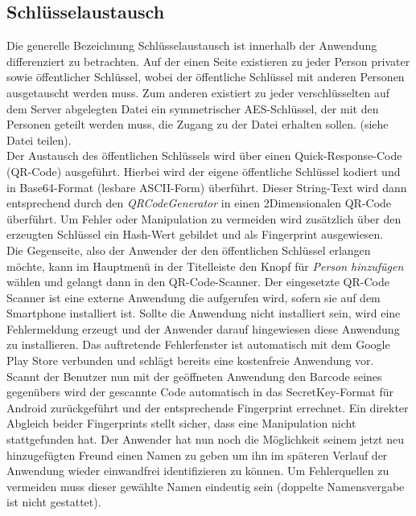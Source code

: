 \documentclass[10pt, a4paper,headsepline]{scrreprt}
\begin{document}
\subsection{Schlüsselaustausch}
Die generelle Bezeichnung Schlüsselaustausch ist innerhalb der Anwendung differenziert zu betrachten. Auf der einen Seite existieren zu jeder Person privater sowie öffentlicher Schlüssel, wobei der öffentliche Schlüssel mit anderen Personen ausgetauscht werden muss. Zum anderen existiert zu jeder verschlüsselten auf dem Server abgelegten Datei ein symmetrischer AES-Schlüssel, der mit den Personen geteilt werden muss, die Zugang zu der Datei erhalten sollen. (siehe Datei teilen). \\
Der Austausch des öffentlichen Schlüssels wird über einen Quick-Response-Code (QR-Code) ausgeführt. Hierbei wird der eigene öffentliche Schlüssel kodiert und in Base64-Format (lesbare ASCII-Form) überführt. Dieser String-Text wird dann entsprechend durch den \textit{QRCodeGenerator} in einen 2Dimensionalen QR-Code überführt. Um Fehler oder Manipulation zu vermeiden wird zusätzlich über den erzeugten Schlüssel ein Hash-Wert gebildet und als Fingerprint ausgewiesen. \\
Die Gegenseite, also der Anwender der den öffentlichen Schlüssel erlangen möchte, kann im Hauptmenü in der Titelleiste den Knopf für \textit{Person hinzufügen} wählen und gelangt dann in den QR-Code-Scanner. Der eingesetzte QR-Code Scanner ist eine externe Anwendung die aufgerufen wird, sofern sie auf dem Smartphone installiert ist. Sollte die Anwendung nicht installiert sein, wird eine Fehlermeldung erzeugt und der Anwender darauf hingewiesen diese Anwendung zu installieren. Das auftretende Fehlerfenster ist automatisch mit dem Google Play Store verbunden und schlägt bereits eine kostenfreie Anwendung vor. \\
Scannt der Benutzer nun mit der geöffneten Anwendung den Barcode seines gegenübers wird der gescannte Code automatisch in das SecretKey-Format für Android zurückgeführt und der entsprechende Fingerprint errechnet. Ein direkter Abgleich beider Fingerprints stellt sicher, dass eine Manipulation nicht stattgefunden hat. Der Anwender hat nun noch die Möglichkeit seinem jetzt neu hinzugefügten Freund einen Namen zu geben um ihn im späteren Verlauf der Anwendung wieder einwandfrei identifizieren zu können. Um Fehlerquellen zu vermeiden muss dieser gewählte Namen eindeutig sein (doppelte Namensvergabe ist nicht gestattet).
\end{document}
